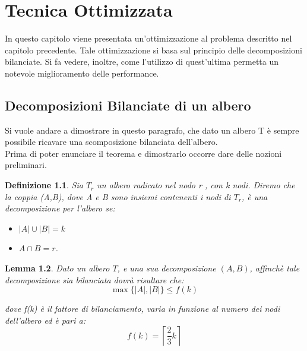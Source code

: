 \chapter{Tecnica Ottimizzata}

In questo capitolo viene presentata un'ottimizzazione al problema descritto nel capitolo precedente.
Tale ottimizzazione si basa sul principio delle decomposizioni bilanciate.
Si fa vedere, inoltre, come l'utilizzo di quest'ultima permetta un notevole miglioramento delle performance.

\section{Decomposizioni Bilanciate di un albero}
Si vuole andare a dimostrare in questo paragrafo, che dato un albero T \`e sempre possibile ricavare una scomposizione bilanciata dell'albero.
\\
Prima di poter enunciare il teorema e dimostrarlo occorre dare delle nozioni preliminari.

\newtheorem{definizione}{Definizione}[section]
\newtheorem{lemma}[definizione]{Lemma}
\begin{definizione}
	\label{definizioneDeco}
Sia $T_r$ un albero radicato nel nodo r , con k nodi.
Diremo che la coppia (A,B), dove  A e B sono insiemi contenenti i nodi di $T_r$, \`e una decomposizione per l'albero se:
\begin{itemize}
	\item $| A |\cup| B | = k$
	\item $A \cap B = r$.
\end{itemize}
\end{definizione}


\begin{lemma}
\label{lemmaDeco}
Dato un albero $ T $, e una sua decomposizione $ (A,B) $, affinch\`e tale decomposizione sia bilanciata dovr\`a risultare che:
\begin{equation*}
	\max{ \{|A| , |B| \} }  \le  f(k)
\end{equation*}


dove f(k) \`e il fattore di bilanciamento, varia in funzione al numero dei nodi dell'albero ed \`e pari a:
\begin{equation*}
f(k) = \left\lceil \frac{2}{3}  k  \right\rceil 
\end{equation*}
\end{lemma}\mbox{}

